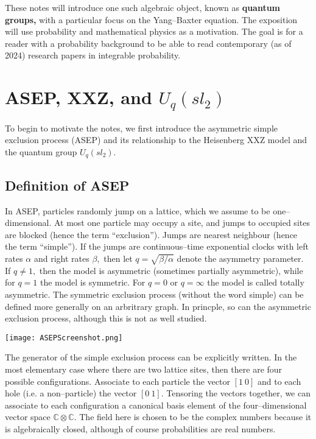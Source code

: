 \documentclass{ximera}
\begin{document}
These notes will introduce one such algebraic object, known as \textbf{quantum groups,} with a particular
focus on the Yang--Baxter equation. The exposition will use probability and mathematical physics as a
motivation. The goal is for a reader with a probability background to be able to read contemporary (as of
2024) research papers in integrable probability. 



\section{ASEP, XXZ, and $U_q(sl_2)$}

To begin to motivate the notes, we first introduce the asymmetric simple exclusion process (ASEP) and its relationship to 
the Heisenberg XXZ model and the quantum group $U_q(sl_2).$ 

\subsection{Definition of ASEP}
In ASEP, particles randomly jump on a lattice, which we assume to be
one--dimensional. At most one particle may occupy a site, and jumps to occupied sites are blocked (hence the term ``exclusion'').
Jumps are nearest neighbour (hence the term ``simple''). If the jumps are continuous--time exponential 
clocks with left rates $\alpha$ and right rates $\beta,$ then let $q=\sqrt{\beta/\alpha}$ denote the 
asymmetry parameter. If $q\neq 1,$ then the model is asymmetric (sometimes partially asymmetric), 
while for $q=1$ the model is symmetric. For $q=0$ or $q=\infty$ the model is called totally asymmetric.
The symmetric exclusion process (without the word simple) can be defined more generally on an arbritrary graph. In princple, so can 
the asymmetric exclusion process, although this is not as well studied.  

\texttt{[image: ASEPScreenshot.png]}

The generator of the simple exclusion process can be explicitly written. In the most elementary case 
where there are two lattice sites, then there are four possible configurations. Associate to each
particle the vector $[1\ 0]$ and to each hole (i.e. a non--particle) the vector $[0 \ 1].$ Tensoring
the vectors together, we can associate to each configuration a canonical basis element of the four--dimensional
vector space $\mathbb{C}\otimes \mathbb{C}.$ The field here is chosen to be the complex numbers because
it is algebraically closed, although of course probabilities are real numbers. 
\end{document}
